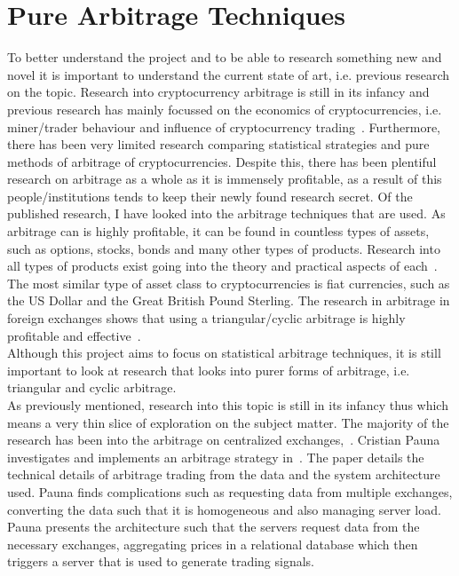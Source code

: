 \section{Pure Arbitrage Techniques}
To better understand the project and to be able to research something new and novel it is important to understand the current state of art, i.e. previous research on the topic. Research into cryptocurrency arbitrage is still in its infancy and previous research has mainly focussed on the economics of cryptocurrencies, i.e. miner/trader behaviour and influence of cryptocurrency trading~\cite{eyal2015miner, avarikioti2020ride, huberman2021monopoly, athey2016bitcoin, easley2019mining, harvey2016cryptofinance, pagnotta2018equilibrium}. Furthermore, there has been very limited research comparing statistical strategies and pure methods of arbitrage of cryptocurrencies. Despite this, there has been plentiful research on arbitrage as a whole as it is immensely profitable, as a result of this people/institutions tends to keep their newly found research secret. Of the published research, I have looked into the arbitrage techniques that are used. As arbitrage can is highly profitable, it can be found in countless types of assets, such as options, stocks, bonds and many other types of products. Research into all types of products exist going into the theory and practical aspects of each~\cite{mo_theoretical_nodate, 8957853}. The most similar type of asset class to cryptocurrencies is fiat currencies, such as the US Dollar and the Great British Pound Sterling. The research in arbitrage in foreign exchanges shows that using a triangular/cyclic arbitrage is highly profitable and effective~\cite{akram2008arbitrage, aiba2002triangular, ito2012free}.
\\[5mm]
Although this project aims to focus on statistical arbitrage techniques, it is still important to look at research that looks into purer forms of arbitrage, i.e. triangular and cyclic arbitrage.
\\[5mm]
As previously mentioned, research into this topic is still in its infancy thus which means a very thin slice of exploration on the subject matter. The majority of the research has been into the arbitrage on centralized exchanges,~\cite{MakarovIgor2020Taai, crepelliere_arbitrage_2022, PAUNACristian2018ATSf}. Cristian Pauna investigates and implements an arbitrage strategy in~\cite{PAUNACristian2018ATSf}. The paper details the technical details of arbitrage trading from the data and the system architecture used. Pauna finds complications such as requesting data from multiple exchanges, converting the data such that it is homogeneous and also managing server load. Pauna presents the architecture such that the servers request data from the necessary exchanges, aggregating prices in a relational database which then triggers a server that is used to generate trading signals.

